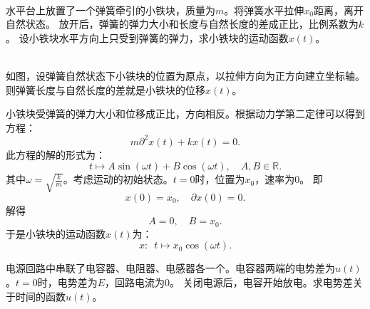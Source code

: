 \documentclass[12pt,UTF8,fontset=none]{ctexbook}
\begin{document}
\begin{et}
    \mbox{} \\水平台上放置了一个弹簧牵引的小铁块，质量为$m$。将弹簧水平拉伸$x_0$距离，离开自然状态。
    放开后，弹簧的弹力大小和长度与自然长度的差成正比，比例系数为$k$。
    设小铁块水平方向上只受到弹簧的弹力，求小铁块的运动函数$x(t)$。%
\end{et}

\begin{so}
    \mbox{} \\
    如图，设弹簧自然状态下小铁块的位置为原点，以拉伸方向为正方向建立坐标轴。
    则弹簧长度与自然长度的差就是小铁块的位移$x(t)$。

    小铁块受弹簧的弹力大小和位移成正比，方向相反。根据动力学第二定律可以得到方程：
    $$ m\partial^2 x(t) + kx(t) = 0. $$
    此方程的解的形式为：
    $$t \mapsto A\sin{(\omega t)} + B\cos{(\omega t)}, \quad  A, B \in \mathbb{R}.$$
    其中$\omega = \sqrt{\frac{k}{m}}$。考虑运动的初始状态。$t=0$时，位置为$x_0$，速率为$0$。
    即
    $$ x(0) = x_0,\quad \partial x(0) = 0.$$
    解得
    $$ A = 0, \quad B = x_0. $$
    于是小铁块的运动函数$x(t)$为：
    $$x:\,\,\, t \mapsto x_0\cos{(\omega t)}.$$
\end{so}

\begin{et}
    电源回路中串联了电容器、电阻器、电感器各一个。电容器两端的电势差为$u(t)$。$t=0$时，电势差为$E$，回路电流为$0$。
    关闭电源后，电容开始放电。求电势差关于时间的函数$u(t)$。
\end{et}
\end{document}
